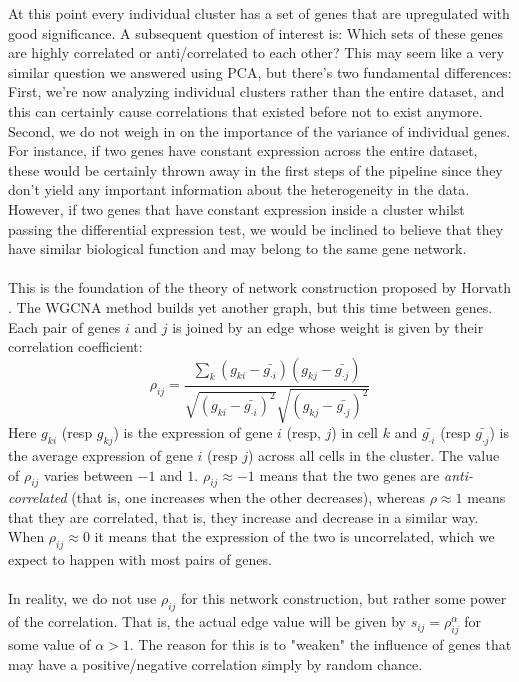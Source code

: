 At this point every individual cluster has a set of genes that are upregulated with good significance. A subsequent question of interest is: Which sets of these genes are highly correlated or anti/correlated to each other? This may seem like a very similar question we answered using PCA, but there's two fundamental differences: First, we're now analyzing individual clusters rather than the entire dataset, and this can certainly cause correlations that existed before not to exist anymore. Second, we do not weigh in on the importance of the variance of individual genes. For instance, if two genes have constant expression across the entire dataset, these would be certainly thrown away in the first steps of the pipeline since they don't yield any important information about the heterogeneity in the data. However, if two genes that have constant expression inside a cluster whilst passing the differential expression test, we would be inclined to believe that they have similar biological function and may belong to the same gene network.\\
\\
This is the foundation of the theory of network construction proposed by Horvath \cite{langfelder2008wgcna}. The WGCNA method builds yet another graph, but this time between genes. Each pair of genes $i$ and $j$ is joined by an edge whose weight is given by their correlation coefficient:
$$
\rho_{ij} = \frac{\sum_{k} (g_{ki} - \bar{g_{\cdot i}})(g_{kj} - \bar{g_{\cdot j}})}	{\sqrt{(g_{ki} - \bar{g_{\cdot i}})^2}\sqrt{(g_{kj} - \bar{g_{\cdot j}})^2}}
$$
Here $g_{ki}$ (resp $g_{kj}$) is the expression of gene $i$ (resp, $j$) in cell $k$ and $\bar{g_{\cdot i}}$ (resp $\bar{g_{\cdot j}}$) is the average expression of gene $i$ (resp $j$) across all cells in the cluster. The value of $\rho_{ij}$ varies between $-1$ and $1$. $\rho_{ij} \approx -1$ means that the two genes are \emph{anti-correlated} (that is, one increases when the other decreases), whereas $\rho \approx 1$ means that they are correlated, that is, they increase and decrease in a similar way. When $\rho_{ij} \approx 0$ it means that the expression of the two is uncorrelated, which we expect to happen with most pairs of genes. \\
\\
In reality, we do not use $\rho_{ij}$ for this network construction, but rather some power of the correlation. That is, the actual edge value will be given by $s_{ij} = \rho_{ij}^{\alpha}$ for some value of $\alpha>1$. The reason for this is to "weaken" the influence of genes that may have a positive/negative correlation simply by random chance. \\
